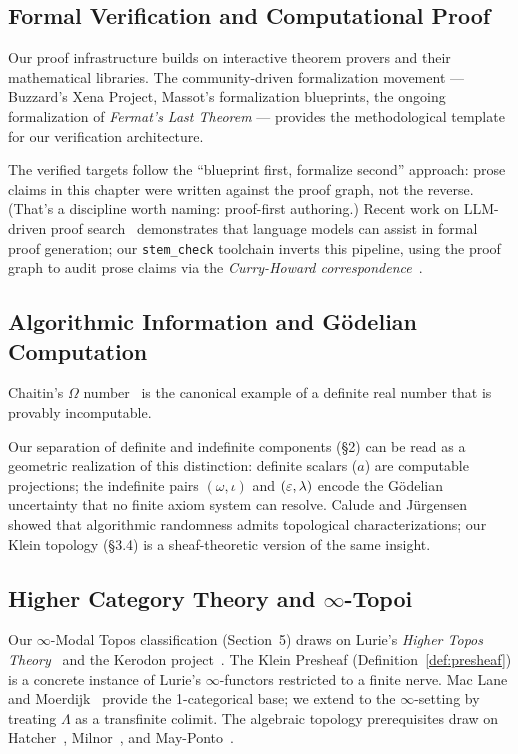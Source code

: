 \subsection*{Formal Verification and Computational Proof}

Our proof infrastructure builds on interactive theorem provers and their mathematical libraries. The community-driven formalization movement --- Buzzard's Xena Project, Massot's formalization blueprints, the ongoing formalization of \emph{Fermat's Last Theorem} --- provides the methodological template for our verification architecture.

The verified targets follow the ``blueprint first, formalize second'' approach: prose claims in this chapter were written against the proof graph, not the reverse. (That's a discipline worth naming: proof-first authoring.) Recent work on LLM-driven proof search~\cite{autoformbot,safe-verification} demonstrates that language models can assist in formal proof generation; our \texttt{stem\_check} toolchain inverts this pipeline, using the proof graph to audit prose claims via the \emph{Curry-Howard correspondence}~\cite{curry-howard}.

\subsection*{Algorithmic Information and G\"odelian Computation}

Chaitin's $\Omega$ number~\cite{chaitin-omega} is the canonical example of a definite real number that is provably incomputable.

Our separation of definite and indefinite components (\S2) can be read as a geometric realization of this distinction: definite scalars ($a$) are computable projections; the indefinite pairs $(\omega, \iota)$ and $(\varepsilon, \lambda)$ encode the G\"odelian uncertainty that no finite axiom system can resolve. Calude and J\"urgensen~\cite{calude-randomness} showed that algorithmic randomness admits topological characterizations; our Klein topology (\S3.4) is a sheaf-theoretic version of the same insight.

\subsection*{Higher Category Theory and $\infty$-Topoi}

Our $\infty$-Modal Topos classification (Section~5) draws on Lurie's \emph{Higher Topos Theory}~\cite{lurie-htt} and the Kerodon project~\cite{kerodon}. The Klein Presheaf (Definition~\ref{def:presheaf}) is a concrete instance of Lurie's $\infty$-functors restricted to a finite nerve. Mac Lane and Moerdijk~\cite{maclane-moerdijk} provide the 1-categorical base; we extend to the $\infty$-setting by treating $\Lambda$ as a transfinite colimit. The algebraic topology prerequisites draw on Hatcher~\cite{hatcher}, Milnor~\cite{milnor}, and May-Ponto~\cite{may-ponto}.




